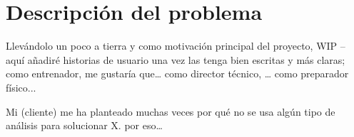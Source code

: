 \chapter{Descripción del problema}
Llevándolo un poco a tierra y como motivación principal del proyecto,
WIP
-- aquí añadiré historias de usuario una vez las tenga bien escritas y más claras;
como entrenador, me gustaría que\dots
como director técnico, \dots
como preparador físico...

Mi (cliente) me ha planteado muchas veces por qué no se usa algún tipo de 
análisis para solucionar X. por eso… 
